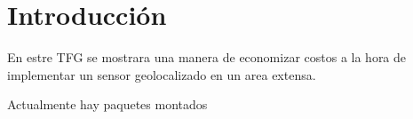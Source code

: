 
\chapter{Introducción}

En estre TFG se mostrara una manera de economizar costos a la hora de implementar un sensor geolocalizado en un area extensa.

Actualmente hay paquetes montados
